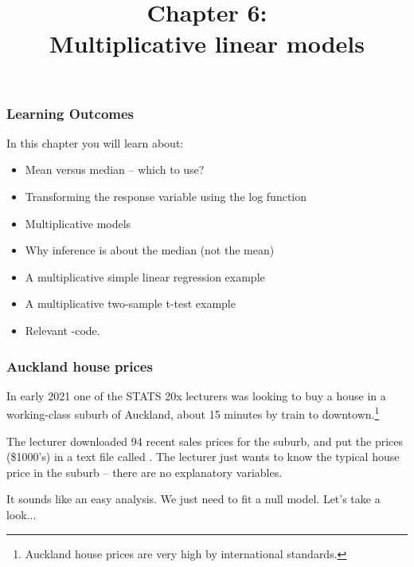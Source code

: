 \documentclass{beamer}\usepackage[]{graphicx}\usepackage[]{xcolor}
\begin{document}
\newcommand{\thechapter}{6}



\title{Chapter 6: \\ Multiplicative linear models}

\begin{frame}
\titlepage
\end{frame}


\begin{frame}[t]
\frametitle{Learning Outcomes}
In this chapter you will learn about:
\begin{center}
\vspace{16pt}
\begin{minipage}{0.9\textwidth}
  \begin{itemize}
  \item Mean versus median -- which to use?
  \item Transforming the response variable using the log function
  \item Multiplicative models
  \item Why inference is about the median (not the mean)
  \item A multiplicative simple linear regression example
  \item A multiplicative two-sample t-test example
  \item Relevant -code.
  \end{itemize}
\end{minipage}
\end{center}
\end{frame}




\begin{frame}[t]
\frametitle{Auckland house prices}
In early 2021 one of the STATS 20x lecturers was looking to buy a house in a working-class suburb of Auckland, about 15 minutes by train to downtown.\footnote{Auckland house prices are very high by international standards.}
\medskip

The lecturer downloaded 94 recent sales prices for the suburb, and put the prices (\$1000's) in a text file called . The lecturer just wants to know the typical house price in the suburb -- there are no explanatory variables.
\bigskip

It sounds like an easy analysis. We just need to fit a null model. Let's take a look...
\end{frame}
\end{document}
